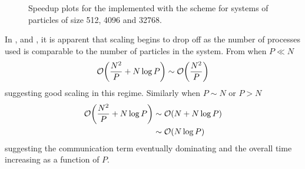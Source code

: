 %
%
\begin{figure}[!h]
    
    \caption{
        Speedup plots for the \pairoperation{} implemented with the \replicateddata{} scheme for systems of particles of size 512, 4096 and 32768.
    }
    \label{fig:v0_replicated_data_pair_operation_speedups}
\end{figure}


%
%
\begin{figure}[!h]
    
    \caption{}
    \label{fig:v0_replicated_pair_operation_512_logtime}
\end  {figure}

\begin{figure}[!h]
    
    \caption{}
    \label{fig:v0_replicated_pair_operation_4096_logtime}
\end  {figure}

\begin{figure}[!h]
    
    \caption{}
    \label{fig:v0_replicated_pair_operation_32768_logtime}
\end  {figure}

\vZeroTimeExplanation
    {}
    {}
    {}
    {\pairoperation{}}
    {\replicateddata{}}

In ,
 and
,
it is apparent that scaling begins to drop off as the number
of processes used is comparable to the number of particles in the system.
%
From  when $P \ll{} N$
\begin{equation}
    \mathcal{O}{\left({ \frac{N^2}{P} + N\log{P} }\right)} \sim{} \mathcal{O}{\left({ \frac{N^2}{P} }\right)}
\end  {equation}
suggesting good scaling in this regime.
%
Similarly when $P \sim{} N$
or $P > N$
\begin{align}
    \mathcal{O}{\left({ \frac{N^2}{P} + N\log{P} }\right)}
        &\sim{} \mathcal{O}{\left({ N + N\log{P} }\right)} \\
        &\sim{} \mathcal{O}{\left({ N\log{P} }\right)}
\end  {align}
%
suggesting the communication term eventually dominating and
the overall time increasing as a function of $P$.

